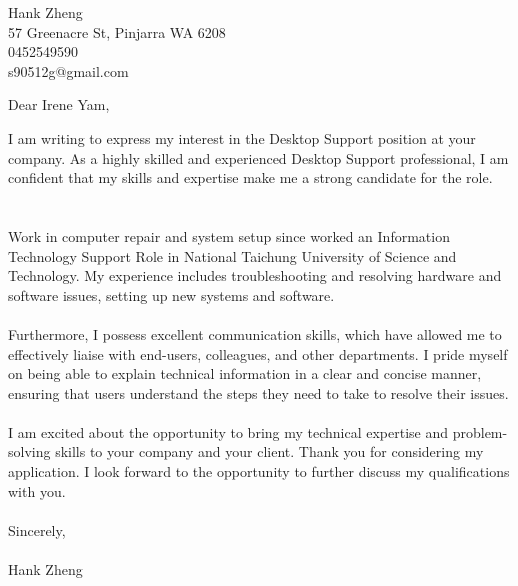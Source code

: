 \documentclass[16pt letterpaper]{letter}
\begin{document}
\pagestyle{empty}
\begin{center}
Hank Zheng\\[0.2cm]
57 Greenacre St, Pinjarra WA 6208\\[0.2cm]
0452549590\\[0.2cm]
s90512g@gmail.com
\end{center}
Dear Irene Yam,

I am writing to express my interest in the Desktop Support position at your company. As a highly skilled and experienced Desktop Support professional, I am confident that my skills and expertise make me a strong candidate for the role.\\
\\\\
Work in computer repair and system setup since worked an Information Technology Support Role in National Taichung University of Science and Technology. My experience includes troubleshooting and resolving hardware and software issues, setting up new systems and software.
\\\\
Furthermore, I possess excellent communication skills, which have allowed me to effectively liaise with end-users, colleagues, and other departments. I pride myself on being able to explain technical information in a clear and concise manner, ensuring that users understand the steps they need to take to resolve their issues.
\\\\
I am excited about the opportunity to bring my technical expertise and problem-solving skills to your company and your client. Thank you for considering my application. I look forward to the opportunity to further discuss my qualifications with you.
\\\\
Sincerely,\\\\
Hank Zheng
\end{document}
